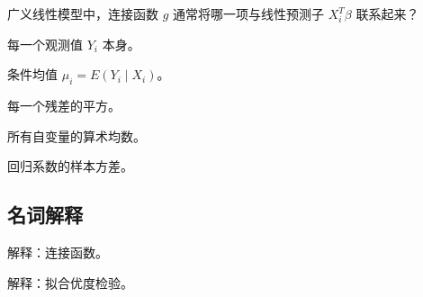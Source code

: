 \par\addvspace{8pt}\noindent\begin{minipage}{\linewidth}


广义线性模型中，连接函数 \(g\) 通常将哪一项与线性预测子 \(X_i^T\beta\) 联系起来？


\begin{choices}

\item 每一个观测值 \(Y_i\) 本身。

\item 条件均值 \(\mu_i=E(Y_i\mid X_i)\)。

\item 每一个残差的平方。

\item 所有自变量的算术均数。

\item 回归系数的样本方差。

\end{choices}

\end{minipage}\par\vspace{5pt}

\par\addvspace{8pt}\noindent\begin{minipage}{\linewidth}

\subsection{名词解释}


解释：连接函数。



\end{minipage}\par\vspace{5pt}

\par\addvspace{8pt}\noindent\begin{minipage}{\linewidth}


解释：拟合优度检验。



\end{minipage}\par\vspace{5pt}

